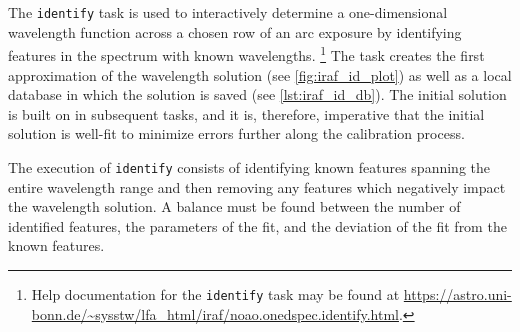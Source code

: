 The \texttt{identify} task is used to interactively determine a one-dimensional wavelength function across a chosen row of an arc exposure by identifying features in the spectrum with known wavelengths.%
\footnote{Help documentation for the \texttt{identify} task may be found at \url{https://astro.uni-bonn.de/~sysstw/lfa_html/iraf/noao.onedspec.identify.html}.}
The task creates the first approximation of the wavelength solution (see \autoref{fig:iraf_id_plot}) as well as a local database in which the solution is saved (see \autoref{lst:iraf_id_db}). The initial solution is built on in subsequent tasks, and it is, therefore, imperative that the initial solution is well-fit to minimize errors further along the calibration process.

The execution of \texttt{identify} consists of identifying known features spanning the entire wavelength range and then removing any features which negatively impact the wavelength solution. A balance must be found between the number of identified features, the parameters of the fit, and the deviation of the fit from the known features.

